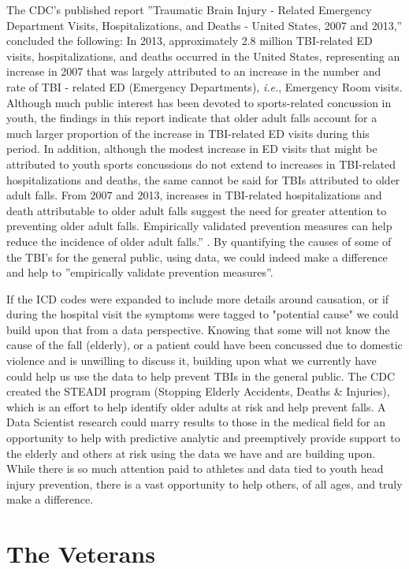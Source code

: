 \documentclass[sigconf]{acmart}
\begin{document}
The CDC's published report ''Traumatic Brain Injury - Related Emergency Department Visits, Hospitalizations, and Deaths - United States, 2007 and 2013,'' concluded the following: In 2013, approximately 2.8 million TBI-related ED visits, hospitalizations, and deaths occurred in the United States, representing an increase in 2007 that was largely attributed to an increase in the number and rate of TBI - related ED (Emergency Departments), {\em i.e.}, Emergency Room visits.  Although much public interest has been devoted to sports-related concussion in youth, the findings in this report indicate that older adult falls account for a much larger proportion of the increase in TBI-related ED visits during this period.  In addition, although the modest increase in ED visits that might be attributed to youth sports concussions do not extend to increases in TBI-related hospitalizations and deaths, the same cannot be said for TBIs attributed to older adult falls.  From 2007 and 2013, increases in TBI-related hospitalizations and death attributable to older adult falls suggest the need for greater attention to preventing older adult falls.  Empirically validated prevention measures can help reduce the incidence of older adult falls.'' \cite{www-cdc-gov}.  By quantifying the causes of some of the TBI's for the general public, using data, we could indeed make a difference and help to ''empirically validate prevention measures''.

If the ICD codes were expanded to include more details around causation, or if during the hospital visit the symptoms were tagged to "potential cause" we could build upon that from a data perspective.  Knowing that some will not know the cause of the fall (elderly), or a patient could have been concussed due to domestic violence and is unwilling to discuss it, building upon what we currently have could help us use the data to help prevent TBIs in the general public.  The CDC created the STEADI program (Stopping Elderly Accidents, Deaths & Injuries), which is an effort to help identify older adults at risk and help prevent falls.  A Data Scientist research could marry results to those in the medical field for an opportunity to help with predictive analytic and preemptively provide support to the elderly and others at risk using the data we have and are building upon.  While there is so much attention paid to athletes and data tied to youth head injury prevention, there is a vast opportunity to help others, of all ages, and truly make a difference.  

\section{The Veterans}
\end{document}
